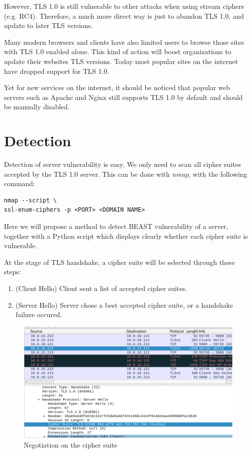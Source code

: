 \documentclass{acm_proc_article-sp}
\begin{document}
However, TLS 1.0 is still vulnerable to other attacks when using stream ciphers (e.g. RC4).
Therefore, a much more direct way is just to abandon TLS 1.0, and update to later TLS
versions.

Many modern browsers and clients have also limited users to browse those sites
with TLS 1.0 enabled alone. This kind of action will boost organizations to update their
websites TLS versions. Today most popular sites on the internet have dropped support for TLS 1.0.

Yet for new services on the internet, it should be noticed that popular web servers such as Apache
and Nginx still supports TLS 1.0 by default\cite{disable} and should be manually disabled.

\section{Detection}
Detection of server vulnerability is easy. We only need to scan all cipher suites accepted by the TLS
1.0 server. This can be done with \textit{nmap}, with the following command:
\begin{lstlisting}
nmap --script \
ssl-enum-ciphers -p <PORT> <DOMAIN NAME>
\end{lstlisting}

Here we will propose a method to detect BEAST vulnerability of a server, together with a
Python script which displays clearly whether each cipher suite is vulnerable.

At the stage of TLS handshake, a cipher suite will be selected through these steps:

\begin{enumerate}
    \item (Client Hello) Client sent a list of accepted cipher suites.
    \item (Server Hello) Server chose a best accepted cipher suite, or a handshake failure occured.
\end{enumerate}

\begin{figure}[htb]
    \centering
    \includegraphics[keepaspectratio, width=\linewidth]{./figures/tls-handshake-cipher-spec.png}
    \caption{Negotiation on the cipher suite}
\end{figure}
\end{document}
